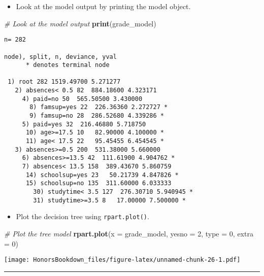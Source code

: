 \documentclass[
]{book}
\newenvironment{Shaded}{\begin{snugshade}}{\end{snugshade}}
\newcommand{\CommentTok}[1]{\textcolor[rgb]{0.56,0.35,0.01}{\textit{#1}}}
\newcommand{\DataTypeTok}[1]{\textcolor[rgb]{0.13,0.29,0.53}{#1}}
\newcommand{\DecValTok}[1]{\textcolor[rgb]{0.00,0.00,0.81}{#1}}
\newcommand{\KeywordTok}[1]{\textcolor[rgb]{0.13,0.29,0.53}{\textbf{#1}}}
\newcommand{\NormalTok}[1]{#1}
\providecommand{\tightlist}{%
  \setlength{\itemsep}{0pt}\setlength{\parskip}{0pt}}
\begin{document}
\begin{itemize}
\tightlist
\item
  Look at the model output by printing the model object.
\end{itemize}

\begin{Shaded}
\begin{Highlighting}[]
\CommentTok{# Look at the model output                      }
\KeywordTok{print}\NormalTok{(grade_model)}
\end{Highlighting}
\end{Shaded}

\begin{verbatim}
n= 282 

node), split, n, deviance, yval
      * denotes terminal node

 1) root 282 1519.49700 5.271277  
   2) absences< 0.5 82  884.18600 4.323171  
     4) paid=no 50  565.50500 3.430000  
       8) famsup=yes 22  226.36360 2.272727 *
       9) famsup=no 28  286.52680 4.339286 *
     5) paid=yes 32  216.46880 5.718750  
      10) age>=17.5 10   82.90000 4.100000 *
      11) age< 17.5 22   95.45455 6.454545 *
   3) absences>=0.5 200  531.38000 5.660000  
     6) absences>=13.5 42  111.61900 4.904762 *
     7) absences< 13.5 158  389.43670 5.860759  
      14) schoolsup=yes 23   50.21739 4.847826 *
      15) schoolsup=no 135  311.60000 6.033333  
        30) studytime< 3.5 127  276.30710 5.940945 *
        31) studytime>=3.5 8   17.00000 7.500000 *
\end{verbatim}

\begin{itemize}
\tightlist
\item
  Plot the decision tree using \texttt{rpart.plot()}.
\end{itemize}

\begin{Shaded}
\begin{Highlighting}[]
\CommentTok{# Plot the tree model}
\KeywordTok{rpart.plot}\NormalTok{(}\DataTypeTok{x =}\NormalTok{ grade_model, }\DataTypeTok{yesno =} \DecValTok{2}\NormalTok{, }\DataTypeTok{type =} \DecValTok{0}\NormalTok{, }\DataTypeTok{extra =} \DecValTok{0}\NormalTok{)}
\end{Highlighting}
\end{Shaded}

\texttt{[image: HonorsBookdown\_files/figure-latex/unnamed-chunk-26-1.pdf]}

\begin{center}\rule{0.5\linewidth}{0.5pt}\end{center}
\end{document}
